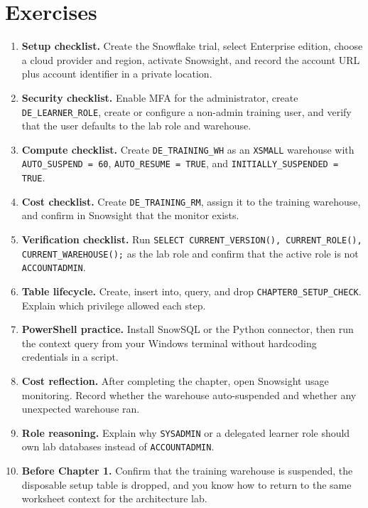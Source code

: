 \section{Exercises}
\begin{enumerate}
    \item \textbf{Setup checklist.} Create the Snowflake trial, select Enterprise edition, choose a cloud provider and region, activate Snowsight, and record the account URL plus account identifier in a private location.
    \item \textbf{Security checklist.} Enable MFA for the administrator, create \texttt{DE\_LEARNER\_ROLE}, create or configure a non-admin training user, and verify that the user defaults to the lab role and warehouse.
    \item \textbf{Compute checklist.} Create \texttt{DE\_TRAINING\_WH} as an \texttt{XSMALL} warehouse with \texttt{AUTO\_SUSPEND = 60}, \texttt{AUTO\_RESUME = TRUE}, and \texttt{INITIALLY\_SUSPENDED = TRUE}.
    \item \textbf{Cost checklist.} Create \texttt{DE\_TRAINING\_RM}, assign it to the training warehouse, and confirm in Snowsight that the monitor exists.
    \item \textbf{Verification checklist.} Run \texttt{SELECT CURRENT\_VERSION(), CURRENT\_ROLE(), CURRENT\_WAREHOUSE();} as the lab role and confirm that the active role is not \texttt{ACCOUNTADMIN}.
    \item \textbf{Table lifecycle.} Create, insert into, query, and drop \texttt{CHAPTER0\_SETUP\_CHECK}. Explain which privilege allowed each step.
    \item \textbf{PowerShell practice.} Install SnowSQL or the Python connector, then run the context query from your Windows terminal without hardcoding credentials in a script.
    \item \textbf{Cost reflection.} After completing the chapter, open Snowsight usage monitoring. Record whether the warehouse auto-suspended and whether any unexpected warehouse ran.
    \item \textbf{Role reasoning.} Explain why \texttt{SYSADMIN} or a delegated learner role should own lab databases instead of \texttt{ACCOUNTADMIN}.
    \item \textbf{Before Chapter 1.} Confirm that the training warehouse is suspended, the disposable setup table is dropped, and you know how to return to the same worksheet context for the architecture lab.
\end{enumerate}

